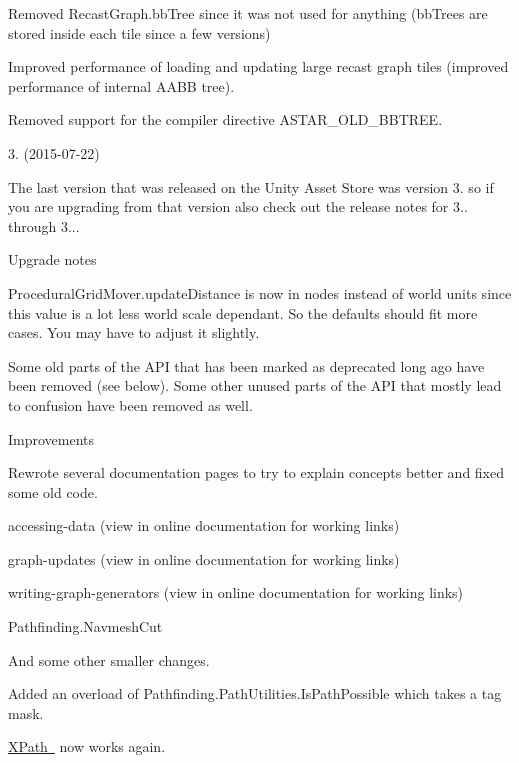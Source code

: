 \begin{DoxyItemize}
\begin{DoxyItemize}
\item Removed Recast\+Graph.\+bb\+Tree since it was not used for anything (bb\+Trees are stored inside each tile since a few versions)
\item Improved performance of loading and updating large recast graph tiles (improved performance of internal A\+A\+BB tree).
\item Removed support for the compiler directive A\+S\+T\+A\+R\+\_\+\+O\+L\+D\+\_\+\+B\+B\+T\+R\+EE.
\end{DoxyItemize}
\item 3. (2015-\/07-\/22)
\begin{DoxyItemize}
\item The last version that was released on the Unity Asset Store was version 3. so if you are upgrading from that version also check out the release notes for 3.. through 3...
\item Upgrade notes
\begin{DoxyItemize}
\item Procedural\+Grid\+Mover.\+update\+Distance is now in nodes instead of world units since this value is a lot less world scale dependant. So the defaults should fit more cases. You may have to adjust it slightly.
\item Some old parts of the A\+PI that has been marked as deprecated long ago have been removed (see below). Some other unused parts of the A\+PI that mostly lead to confusion have been removed as well.
\end{DoxyItemize}
\item Improvements
\begin{DoxyItemize}
\item Rewrote several documentation pages to try to explain concepts better and fixed some old code.
\begin{DoxyItemize}
\item accessing-\/data (view in online documentation for working links)
\item graph-\/updates (view in online documentation for working links)
\item writing-\/graph-\/generators (view in online documentation for working links)
\item Pathfinding.\+Navmesh\+Cut
\item And some other smaller changes.
\end{DoxyItemize}
\item Added an overload of Pathfinding.\+Path\+Utilities.\+Is\+Path\+Possible which takes a tag mask.
\item \mbox{\hyperlink{}{X\+Path }} now works again.

\end{DoxyItemize}
\end{DoxyItemize}
\end{DoxyItemize}

